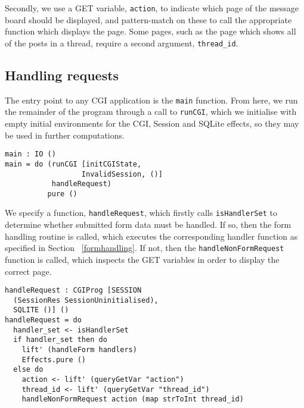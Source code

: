 \documentclass[preprint]{sigplanconf}
\begin{document}
Secondly, we use a GET variable, \texttt{action}, to indicate which page of the message board should be displayed, and pattern-match on these to call the appropriate function which displays the page. Some pages, such as the page which shows all of the posts in a thread, require a second argument, \texttt{thread\_id}. 
\subsection{Handling requests}
The entry point to any CGI application is the \texttt{main} function. From here, we run the remainder of the program through a call to \texttt{runCGI}, which we initialise with empty initial environments for the CGI, Session and SQLite effects, so they may be used in further computations. 
\begin{Verbatim}
main : IO ()
main = do (runCGI [initCGIState, 
                  InvalidSession, ()] 
           handleRequest)
          pure ()
\end{Verbatim}
We specify a function, \texttt{handleRequest}, which firstly calls \texttt{isHandlerSet} to determine whether submitted form data must be handled. If so, then the form handling routine is called, which executes the corresponding handler function as specified in Section ~\ref{formhandling}. If not, then the \texttt{handleNonFormRequest} function is called, which inspects the GET variables in order to display the correct page.
\begin{Verbatim}
handleRequest : CGIProg [SESSION 
  (SessionRes SessionUninitialised), 
  SQLITE ()] ()
handleRequest = do 
  handler_set <- isHandlerSet
  if handler_set then do
    lift' (handleForm handlers)
    Effects.pure ()
  else do
    action <- lift' (queryGetVar "action")
    thread_id <- lift' (queryGetVar "thread_id")
    handleNonFormRequest action (map strToInt thread_id)
\end{Verbatim}
\end{document}
